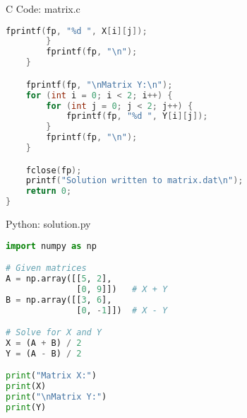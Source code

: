 \documentclass{beamer}
\numberwithin{equation}{section}
\theoremstyle{remark}
\begin{document}
\begin{frame}[fragile]{C Code: matrix.c}
\begin{lstlisting}[language=C]
 fprintf(fp, "%d ", X[i][j]);
        }
        fprintf(fp, "\n");
    }

    fprintf(fp, "\nMatrix Y:\n");
    for (int i = 0; i < 2; i++) {
        for (int j = 0; j < 2; j++) {
            fprintf(fp, "%d ", Y[i][j]);
        }
        fprintf(fp, "\n");
    }

    fclose(fp);
    printf("Solution written to matrix.dat\n");
    return 0;
}
\end{lstlisting}
\end{frame}

\begin{frame}[fragile]{Python: solution.py}
\begin{lstlisting}[language=Python]
 import numpy as np

# Given matrices
A = np.array([[5, 2],
              [0, 9]])   # X + Y
B = np.array([[3, 6],
              [0, -1]])  # X - Y

# Solve for X and Y
X = (A + B) / 2
Y = (A - B) / 2

print("Matrix X:")
print(X)
print("\nMatrix Y:")
print(Y)



\end{lstlisting}
\end{frame} 
\end{document}

